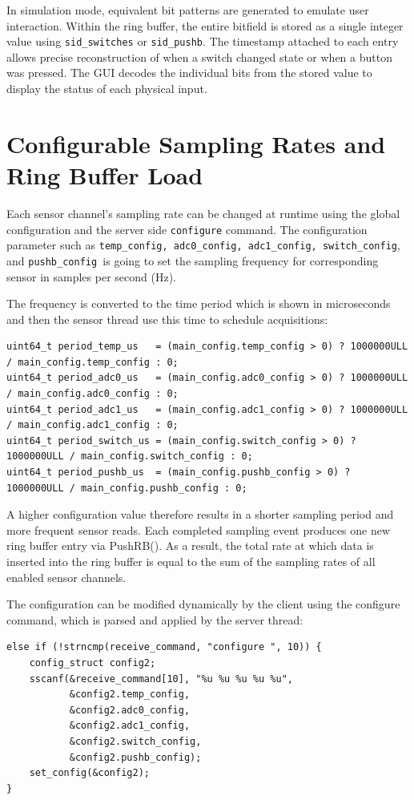 In simulation mode, equivalent bit patterns are generated to emulate user interaction.
Within the ring buffer, the entire bitfield is stored as a single integer value using \texttt{sid\_switches} or \texttt{sid\_pushb}. The timestamp attached to each entry allows precise reconstruction of when a switch changed state or when a button was pressed. The GUI decodes the individual bits from the stored value to display the status of each physical input.

\section{Configurable Sampling Rates and Ring Buffer Load}
Each sensor channel’s sampling rate can be changed at runtime using the global configuration and the server side \texttt{configure} command. The configuration parameter such as \texttt{temp\_config, adc0\_config, adc1\_config, switch\_config}, and \texttt{pushb\_config }is going to set the sampling frequency for corresponding sensor in samples per second (Hz).

The frequency is converted to the time period which is shown in microseconds and then the sensor thread use this time to schedule acquisitions:

\begin{verbatim}
uint64_t period_temp_us   = (main_config.temp_config > 0) ? 1000000ULL / main_config.temp_config : 0;
uint64_t period_adc0_us   = (main_config.adc0_config > 0) ? 1000000ULL / main_config.adc0_config : 0;
uint64_t period_adc1_us   = (main_config.adc1_config > 0) ? 1000000ULL / main_config.adc1_config : 0;
uint64_t period_switch_us = (main_config.switch_config > 0) ? 1000000ULL / main_config.switch_config : 0;
uint64_t period_pushb_us  = (main_config.pushb_config > 0) ? 1000000ULL / main_config.pushb_config : 0;
\end{verbatim}
A higher configuration value therefore results in a shorter sampling period and more frequent sensor reads. Each completed sampling event produces one new ring buffer entry via PushRB(). As a result, the total rate at which data is inserted into the ring buffer is equal to the sum of the sampling rates of all enabled sensor channels.

The configuration can be modified dynamically by the client using the configure command, which is parsed and applied by the server thread:

\begin{verbatim}
else if (!strncmp(receive_command, "configure ", 10)) {
    config_struct config2;
    sscanf(&receive_command[10], "%u %u %u %u %u",
           &config2.temp_config,
           &config2.adc0_config,
           &config2.adc1_config,
           &config2.switch_config,
           &config2.pushb_config);
    set_config(&config2);
}
\end{verbatim}

